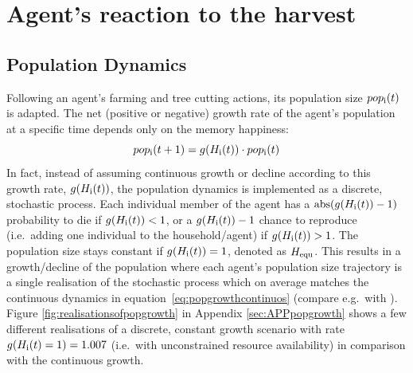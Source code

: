 \section{Agent's reaction to the harvest}\label{sec:Reaction} 
\subsection{Population Dynamics}
Following an agent's farming and tree cutting actions, its population size $pop_{\rm i}(t)$ is adapted. 
The net (positive or negative) growth rate of the agent's population at a specific time depends only on the memory happiness:
\begin{equation}\label{eq:popgrowthcontinuos}
pop_{\rm i}(t+1) = g(H_{\rm i}(t)) \cdot pop_{\rm i}(t)
\end{equation}
In fact, instead of assuming continuous growth or decline according to this growth rate, $g(H_{\rm i}(t))$, the population dynamics is implemented as a discrete, stochastic process.
Each individual member of the agent has a ${\rm abs}(g(H_{\rm i}(t))-1)$ probability to die if $g(H_{\rm i}(t))<1$, or a $g(H_{\rm i}(t))-1$ chance to reproduce (i.e.\ adding one individual to the household/agent) if $g(H_{\rm i}(t))>1$.
The population size stays constant if $g(H_{\rm i}(t))=1$, denoted as $H_{\rm equ}$. 
This results in a growth/decline of the population where each agent's population size trajectory is a single realisation of the stochastic process which on average matches the continuous dynamics in equation~\ref{eq:popgrowthcontinuos} (compare e.g.\ with \cite{Bungartz2009}).
Figure \ref{fig:realisationsofpopgrowth} in Appendix \ref{sec:APPpopgrowth} shows a few different realisations of a discrete, constant growth scenario with rate $g(H_{\rm i}(t)=1)=1.007$ (i.e.\ with unconstrained resource availability) in comparison with the continuous growth.

